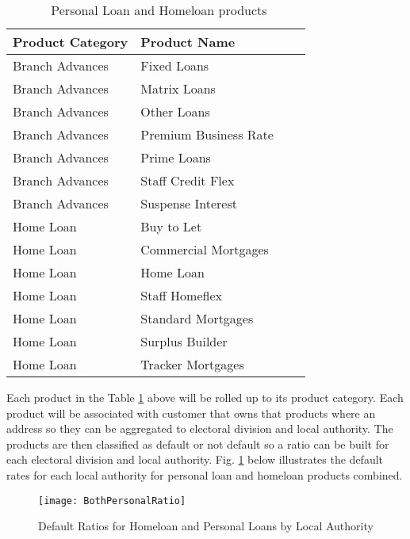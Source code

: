 \begin{table}[H]
	\centering
		\small
			\begin{tabular}{|l|l|l|l|}
			\hline
			\textbf{Product Category} & \textbf{Product Name} \\ \hline
			Branch Advances     & Fixed Loans \\ \hline
			Branch Advances     & Matrix Loans \\ \hline
			Branch Advances     & Other Loans \\ \hline
			Branch Advances     & Premium Business Rate \\ \hline
			Branch Advances     & Prime Loans \\ \hline
			Branch Advances     & Staff Credit Flex \\ \hline
			Branch Advances		& Suspense Interest \\ \hline
			Home Loan           & Buy to Let \\ \hline
			Home Loan           & Commercial Mortgages \\ \hline
			Home Loan           & Home Loan \\ \hline
			Home Loan           & Staff Homeflex \\ \hline
			Home Loan           & Standard Mortgages \\ \hline	
			Home Loan           & Surplus Builder \\ \hline		
			Home Loan           & Tracker Mortgages \\ \hline		
		\end{tabular}
	\caption{\subjectname\ Personal Loan and Homeloan products}
	\label{table:AIB_Products}
\end{table}

Each product in the Table \ref{table:AIB_Products} above will be rolled up to its product category. Each product will be associated with customer that owns that products where an address so they can be aggregated to electoral division and local authority. The products are then classified as default or not default so a ratio can be built for each electoral division and local authority. Fig. \ref{fig:BothPersonalRatio} below illustrates the default rates for each local authority for personal loan and homeloan products combined. 

\begin{figure}[H]
	\texttt{[image: BothPersonalRatio]}
	\caption{Default Ratios for Homeloan and Personal Loans by Local Authority}
	\label{fig:BothPersonalRatio}
\end{figure}


